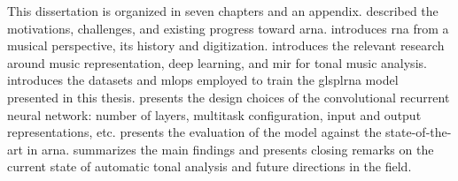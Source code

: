 
This dissertation is organized in seven chapters and an
appendix.  described the motivations,
challenges, and existing progress toward \gls{arna}.
 introduces
\gls{rna} from a musical perspective, its history and
digitization.  introduces the relevant
research around music representation, deep learning, and
\gls{mir} for tonal music analysis.
 introduces the
datasets and \gls{mlops} employed to train the glspl{rna}
model presented in this thesis. 
presents the design choices of the convolutional recurrent
neural network: number of layers, multitask configuration,
input and output representations, etc.
 presents the evaluation of
the model against the state-of-the-art in \gls{arna}.
 summarizes the main findings and
presents closing remarks on the current state of automatic
tonal analysis and future directions in the field.
